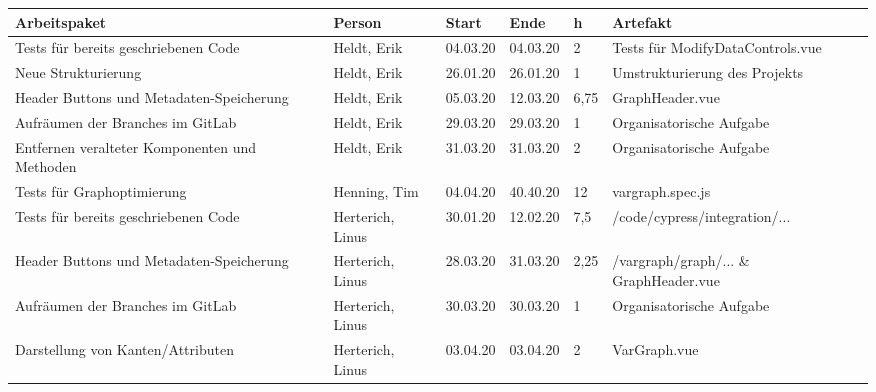 \begin{itemize}
\begin{longtable}{|p{4cm}|p{2cm}|p{1.2cm}|p{1.2cm}|p{0.7cm}|p{3.8cm}|}
  \hline
  Arbeitspaket                                                          & Person                & Start    & Ende     & h     & Artefakt                                                    \\
  \hline
  Tests für bereits geschriebenen Code                                  & Heldt, Erik           & 04.03.20 & 04.03.20 & 2     & Tests für ModifyDataControls.vue                            \\ \hline
  Neue Strukturierung                                                   & Heldt, Erik           & 26.01.20 & 26.01.20 & 1     & Umstrukturierung des Projekts                               \\ \hline
  Header Buttons und Metadaten-Speicherung                              & Heldt, Erik           & 05.03.20 & 12.03.20 & 6,75  & GraphHeader.vue                                             \\ \hline
  Aufräumen der Branches im GitLab                                      & Heldt, Erik           & 29.03.20 & 29.03.20 & 1     & Organisatorische Aufgabe                               \\ \hline
  Entfernen veralteter Komponenten und Methoden                         & Heldt, Erik           & 31.03.20 & 31.03.20 & 2     & Organisatorische Aufgabe                                             \\ \hline
  Tests für Graphoptimierung                                            & Henning, Tim          & 04.04.20 & 40.40.20 & 12    & vargraph.spec.js        \\ \hline
  Tests für bereits geschriebenen Code                                  & Herterich, Linus      & 30.01.20 & 12.02.20 & 7,5   & /code/cypress/integration/...                                     \\ \hline
  Header Buttons und Metadaten-Speicherung                              & Herterich, Linus      & 28.03.20 & 31.03.20 & 2,25  & /vargraph/graph/... \& GraphHeader.vue                  \\ \hline
  Aufräumen der Branches im GitLab                                      & Herterich, Linus      & 30.03.20 & 30.03.20 & 1     & Organisatorische Aufgabe  \\ \hline
  Darstellung von Kanten/Attributen                                     & Herterich, Linus      & 03.04.20 & 03.04.20 & 2     & VarGraph.vue               \\ \hline

\end{longtable}
\end{itemize}
